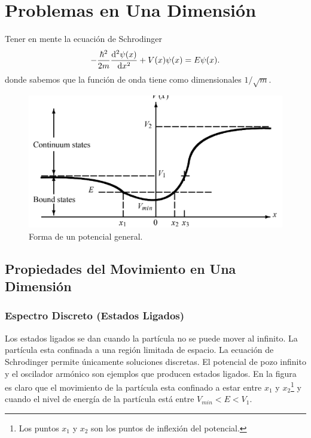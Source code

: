 \chapter{Problemas en Una Dimensión}
Tener en mente la ecuación de Schrodinger
    \begin{equation}
        -\frac{\hbar ^2}{2m} \dv[2]{\psi (x)}{x} + V(x) \psi (x) = E\psi (x).
    \end{equation}
donde sabemos que la función de onda tiene como dimensionales $1/\sqrt{m}$.

\begin{figure}[H]
    \centering
    \includegraphics[scale=0.4]{img/potencial.png}
    \caption{Forma de un potencial general.}
    \label{fig:potencialGeneral}
\end{figure}

\section{Propiedades del Movimiento en Una Dimensión}


\subsection{Espectro Discreto (Estados Ligados)}
Los estados ligados se dan cuando la partícula no se puede mover al infinito. La partícula esta confinada a una región limitada de espacio. La ecuación de Schrodinger permite únicamente soluciones discretas. El potencial de pozo infinito y el oscilador armónico son ejemplos que producen estados ligados. En la figura  es claro que el movimiento de la partícula esta confinado a estar entre $x_1$ y $x_2$\footnote{Los puntos $x_1$ y $x_2$ son los puntos de inflexión del potencial.} y  cuando el nivel de energía de la partícula está entre $V_{min} < E < V_1$.

